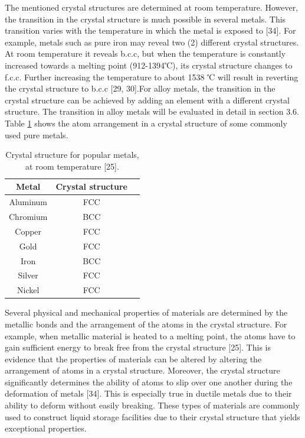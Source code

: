 \documentclass[12pt]{report}
\begin{document}
The mentioned crystal structures are determined at room temperature.  However, the transition in the crystal structure is much possible in several metals. This transition varies with the temperature in which the metal is exposed to [34]. For example, metals such as pure iron may reveal two (2) different crystal structures. At room temperature it reveals b.c.c, but when the temperature is constantly increased towards a melting point (912-1394℃), its crystal structure changes to f.c.c. Further increasing the temperature to about 1538 ℃ will result in reverting the crystal structure to b.c.c [29, 30].For alloy metals, the transition in the crystal structure can be achieved by adding an element with a different crystal structure. The transition in alloy metals will be evaluated in detail in section 3.6. Table \ref{ch3:table:structure} shows the atom arrangement in a crystal structure of some commonly used pure metals.

\begin{table}[H]
\caption{Crystal structure for popular metals, at room temperature [25].}

\centering
\begin{tabular}{ c c c }
    \hline
    Metal & Crystal structure \\
    \hline
    Aluminum & FCC \\
    Chromium & BCC \\
    Copper & FCC \\
    Gold & FCC \\
    Iron & BCC \\
    Silver & FCC \\
    Nickel & FCC \\
    \hline
\end{tabular}

\label{ch3:table:structure}
\end{table}

Several physical and mechanical properties of materials are determined by the metallic bonds and the arrangement of the atoms in the crystal structure. For example, when metallic material is heated to a melting point, the atoms have to gain sufficient energy to break free from the crystal structure [25]. This is evidence that the properties of materials can be altered by altering the arrangement of atoms in a crystal structure. Moreover, the crystal structure significantly determines the ability of atoms to slip over one another during the deformation of metals [34]. This is especially true in ductile metals due to their ability to deform without easily breaking. These types of materials are commonly used to construct liquid storage facilities due to their crystal structure that yields exceptional properties.
\end{document}
